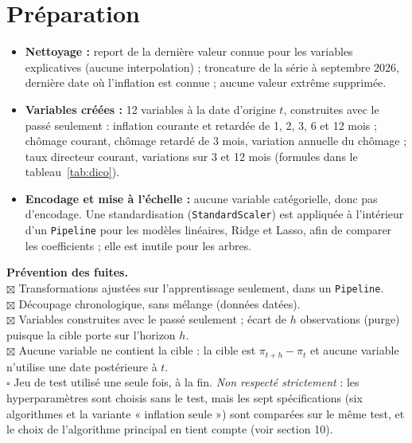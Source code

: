 \documentclass[11pt,a4paper]{article}
\begin{document}
\section{Préparation}
\begin{itemize}
\item \textbf{Nettoyage :} report de la dernière valeur connue pour les variables explicatives (aucune interpolation) ; troncature de la série à septembre 2026, dernière date où l'inflation est connue ; aucune valeur extrême supprimée.
\item \textbf{Variables créées :} 12 variables à la date d'origine $t$, construites avec le passé seulement : inflation courante et retardée de 1, 2, 3, 6 et 12 mois ; chômage courant, chômage retardé de 3 mois, variation annuelle du chômage ; taux directeur courant, variations sur 3 et 12 mois (formules dans le tableau~\ref{tab:dico}).
\item \textbf{Encodage et mise à l'échelle :} aucune variable catégorielle, donc pas d'encodage. Une standardisation (\texttt{StandardScaler}) est appliquée à l'intérieur d'un \texttt{Pipeline} pour les modèles linéaires, Ridge et Lasso, afin de comparer les coefficients ; elle est inutile pour les arbres.
\end{itemize}

\textbf{Prévention des fuites.}\\
$\boxtimes$ Transformations ajustées sur l'apprentissage seulement, dans un \texttt{Pipeline}.\\
$\boxtimes$ Découpage chronologique, sans mélange (données datées).\\
$\boxtimes$ Variables construites avec le passé seulement ; écart de $h$ observations (purge) puisque la cible porte sur l'horizon $h$.\\
$\boxtimes$ Aucune variable ne contient la cible : la cible est $\pi_{t+h}-\pi_t$ et aucune variable n'utilise une date postérieure à $t$.\\
$\square$ Jeu de test utilisé une seule fois, à la fin. \emph{Non respecté strictement} : les hyperparamètres sont choisis sans le test, mais les sept spécifications (six algorithmes et la variante « inflation seule ») sont comparées sur le même test, et le choix de l'algorithme principal en tient compte (voir section 10).
\end{document}
